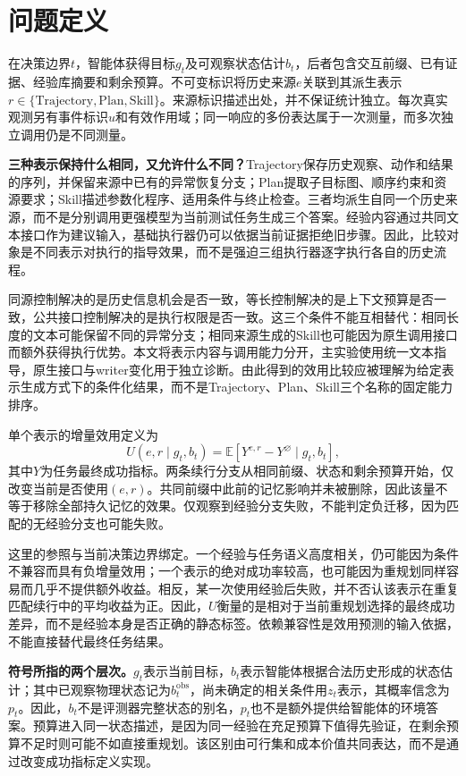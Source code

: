 \documentclass[sigconf,anonymous,review]{acmart}
\newcommand{\E}{\mathbb{E}}
\theoremstyle{zhplain}
\begin{document}
\section{问题定义}
\label{sec:problem}
在决策边界\(t\)，智能体获得目标\(g_t\)及可观察状态估计\(b_t\)，后者包含交互前缀、已有证据、经验库摘要和剩余预算。不可变标识将历史来源\(e\)关联到其派生表示\(r\in\{\mathrm{Trajectory},\mathrm{Plan},\mathrm{Skill}\}\)。来源标识描述出处，并不保证统计独立。每次真实观测另有事件标识\(u\)和有效作用域；同一响应的多份表达属于一次测量，而多次独立调用仍是不同测量。

\textbf{三种表示保持什么相同，又允许什么不同？}Trajectory保存历史观察、动作和结果的序列，并保留来源中已有的异常恢复分支；Plan提取子目标图、顺序约束和资源要求；Skill描述参数化程序、适用条件与终止检查。三者均派生自同一个历史来源，而不是分别调用更强模型为当前测试任务生成三个答案。经验内容通过共同文本接口作为建议输入，基础执行器仍可以依据当前证据拒绝旧步骤。因此，比较对象是不同表示对执行的指导效果，而不是强迫三组执行器逐字执行各自的历史流程。

同源控制解决的是历史信息机会是否一致，等长控制解决的是上下文预算是否一致，公共接口控制解决的是执行权限是否一致。这三个条件不能互相替代：相同长度的文本可能保留不同的异常分支；相同来源生成的Skill也可能因为原生调用接口而额外获得执行优势。本文将表示内容与调用能力分开，主实验使用统一文本指导，原生接口与writer变化用于独立诊断。由此得到的效用比较应被理解为给定表示生成方式下的条件化结果，而不是Trajectory、Plan、Skill三个名称的固定能力排序。

单个表示的增量效用定义为
\begin{equation}
U(e,r\mid g_t,b_t)=\E[Y^{e,r}-Y^{\varnothing}\mid g_t,b_t],
\label{eq:utility}
\end{equation}
其中\(Y\)为任务最终成功指标。两条续行分支从相同前缀、状态和剩余预算开始，仅改变当前是否使用\((e,r)\)。共同前缀中此前的记忆影响并未被删除，因此该量不等于移除全部持久记忆的效果。仅观察到经验分支失败，不能判定负迁移，因为匹配的无经验分支也可能失败。

这里的参照与当前决策边界绑定。一个经验与任务语义高度相关，仍可能因为条件不兼容而具有负增量效用；一个表示的绝对成功率较高，也可能因为重规划同样容易而几乎不提供额外收益。相反，某一次使用经验后失败，并不否认该表示在重复匹配续行中的平均收益为正。因此，\(U\)衡量的是相对于当前重规划选择的最终成功差异，而不是经验本身是否正确的静态标签。依赖兼容性是效用预测的输入依据，不能直接替代最终任务结果。

\textbf{符号所指的两个层次。}\(g_t\)表示当前目标，\(b_t\)表示智能体根据合法历史形成的状态估计；其中已观察物理状态记为\(b_t^{\mathrm{obs}}\)，尚未确定的相关条件用\(z_t\)表示，其概率信念为\(p_t\)。因此，\(b_t\)不是评测器完整状态的别名，\(p_t\)也不是额外提供给智能体的环境答案。预算进入同一状态描述，是因为同一经验在充足预算下值得先验证，在剩余预算不足时则可能不如直接重规划。该区别由可行集和成本价值共同表达，而不是通过改变成功指标定义实现。
\end{document}
